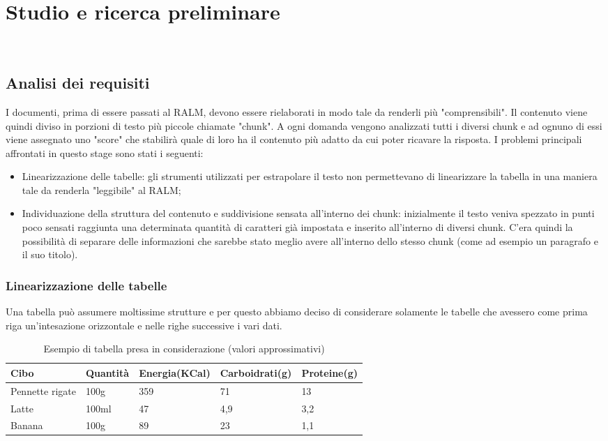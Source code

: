 \chapter{Studio e ricerca preliminare}
\label{cap:analisi preliminare}

 \\

\section{Analisi dei requisiti}
I documenti, prima di essere passati al RALM, devono essere rielaborati in modo tale da renderli più "comprensibili".
Il contenuto viene quindi diviso in porzioni di testo più piccole chiamate "chunk". A ogni domanda vengono analizzati tutti i 
diversi chunk e ad ognuno di essi viene assegnato uno "score" che stabilirà quale di loro ha il contenuto più adatto da cui 
poter ricavare la risposta.
I problemi principali affrontati in questo stage sono stati i seguenti:
\begin{itemize}
    \item Linearizzazione delle tabelle: gli strumenti utilizzati per estrapolare il testo non permettevano di linearizzare 
    la tabella in una maniera tale da renderla "leggibile" al RALM;
    \item Individuazione della struttura del contenuto e suddivisione sensata all'interno dei chunk: 
    inizialmente il testo veniva spezzato in punti poco sensati raggiunta una determinata quantità di caratteri già impostata e inserito all'interno di diversi chunk.
    C'era quindi la possibilità di separare delle informazioni che sarebbe stato meglio avere all'interno dello stesso chunk (come ad esempio un paragrafo e il suo titolo).
\end{itemize}

\subsection{Linearizzazione delle tabelle}
Una tabella può assumere moltissime strutture e per questo abbiamo deciso di considerare solamente le tabelle che avessero come prima riga 
un'intesazione orizzontale e nelle righe successive i vari dati.

\begin{table}[H]
    \centering
    \begin{tabular}{|p{3cm} |p{2cm} |p{2cm}| p{2cm}| p{2cm}|}
        \hline
        Cibo & Quantità & Energia(KCal) & Carboidrati(g) & Proteine(g) \\
        \hline
        Pennette rigate & 100g & 359 & 71 & 13 \\
        \hline
        Latte & 100ml & 47 & 4,9 & 3,2 \\
        \hline
        Banana & 100g & 89 & 23 & 1,1 \\
        \hline
    \end{tabular}
    \caption{Esempio di tabella presa in considerazione (valori approssimativi)}
    \label{tab:esempio-cibo}
\end{table}

